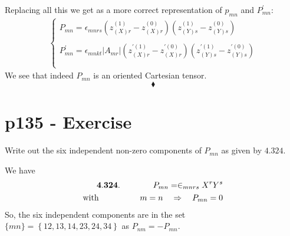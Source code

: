 Replacing all this we get as a more correct representation of $p_{mn}$ and $P^{'}_{mn}$:
\begin{align}
\left\{\begin{array}{l}
P_{mn}= \epsilon_{mnrs}\left(z^{(1)}_{(X)r}- z^{(0)}_{(X)r}\right)\left(z^{(1)}_{(Y)s}- z^{(0)}_{(Y)s}\right)\\\\
P^{'}_{mn}= \epsilon_{mnkt}\left|A_{mr}\right| \left(z^{'(1)}_{(X)r}- z^{'(0)}_{(X)r}\right)\left(z^{'(1)}_{(Y)s}- z^{'(0)}_{(Y)s}\right)\\\\
\end{array}\right.
\end{align}
We see that indeed $P_{mn}$ is an oriented Cartesian tensor.
$$\blacklozenge$$
\newpage

\section{p135 - Exercise}
\begin{tcolorbox}
Write out the six independent non-zero components of $P_{mn}$ as given by $\mathbf{4.324.}$
\end{tcolorbox}
We have 
\begin{align}
\mathbf{4.324.}\quad\quad\quad\quad P_{mn}= \in_{mnrs}X^rY^s\\
\text{with}\quad \quad\quad\quad\quad m=n \quad \Rightarrow \quad P_{mn}= 0
\end{align}
So, the six independent components are in the set $\{mn\}= \left\{12,13,14,23,24,34 \right\}$ as $P_{nm}=-P_{mn}$.
